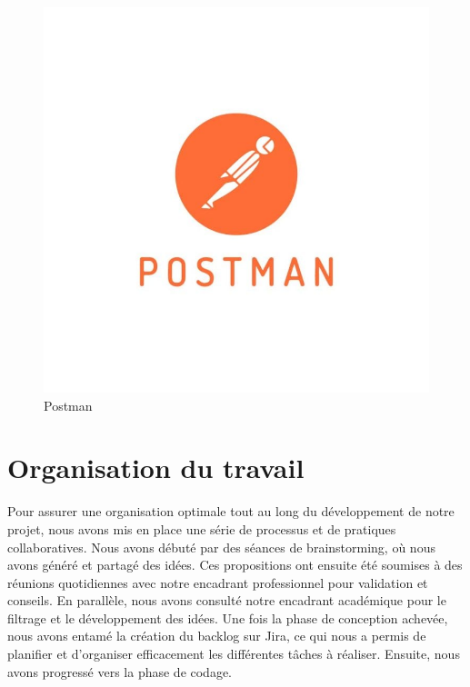 \begin{itemize}
        \begin{figure}[H]
            \centering\includegraphics[scale=0.25]{chap1.images/Postman-Logo.jpg}
            \caption{Postman}
            \label{Postman}
        \end{figure}


\newpage
\section{Organisation du travail}

Pour assurer une organisation optimale tout au long du développement de notre projet, nous avons mis en place une série de processus et de pratiques collaboratives. Nous avons débuté par des séances de brainstorming, où nous avons généré et partagé des idées. Ces propositions ont ensuite été soumises à des réunions quotidiennes avec notre encadrant professionnel pour validation et conseils. En parallèle, nous avons consulté notre encadrant académique pour le filtrage et le développement des idées. Une fois la phase de conception achevée, nous avons entamé la création du backlog sur Jira, ce qui nous a permis de planifier et d'organiser efficacement les différentes tâches à réaliser. Ensuite, nous avons progressé vers la phase de codage.\\


\end{itemize}
